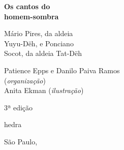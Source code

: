 




\begingroup\thispagestyle{empty}\vspace*{.05\textheight} 

              {\formular
              \huge
              \noindent
              \textbf{Os cantos do\\ 
              homem-sombra}\\
              
              \vspace{-0.5cm}
              
              }

              \vspace{1cm}             

              {\formular\Large
              \noindent{}Mário Pires, da aldeia\\
Yuyu-Dëh, e Ponciano\\
Socot, da aldeia Tat-Dëh}

              \vfill

              {\small
              \noindent{}Patience Epps e Danilo Paiva Ramos\\
              (\textit{organização})\vspace{0.2cm}\\
              \noindent{}Anita Ekman (\textit{ilustração})
              }

              \vspace{0.5cm}

              {\small\noindent{}3ª edição}

              \vfill
              
              \newfontfamily{}
              {\noindent\fontsize{30}{40}\selectfont\timesnewroman hedra}

              {\small\timesnewroman\noindent São Paulo, \the\year}

\endgroup
\pagebreak